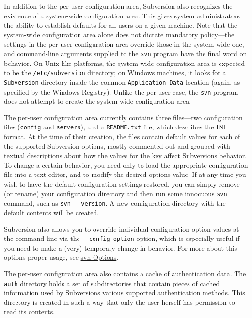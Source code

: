 In addition to the per-user configuration area, Subversion also
recognizes the existence of a system-wide configuration area. This gives
system administrators the ability to establish defaults for all users on
a given machine. Note that the system-wide configuration area alone does
not dictate mandatory policy---the settings in the per-user
configuration area override those in the system-wide one, and
command-line arguments supplied to the \texttt{svn} program have the
final word on behavior. On Unix-like platforms, the system-wide
configuration area is expected to be the \texttt{/etc/subversion}
directory; on Windows machines, it looks for a \texttt{Subversion}
directory inside the common \texttt{Application\ Data} location (again,
as specified by the Windows Registry). Unlike the per-user case, the
\texttt{svn} program does not attempt to create the system-wide
configuration area.

The per-user configuration area currently contains three files---two
configuration files (\texttt{config} and \texttt{servers}), and a
\texttt{README.txt} file, which describes the INI format. At the time of
their creation, the files contain default values for each of the
supported Subversion options, mostly commented out and grouped with
textual descriptions about how the values for the key affect
Subversion\textquotesingle s behavior. To change a certain behavior, you
need only to load the appropriate configuration file into a text editor,
and to modify the desired option\textquotesingle s value. If at any time
you wish to have the default configuration settings restored, you can
simply remove (or rename) your configuration directory and then run some
innocuous \texttt{svn} command, such as \texttt{svn\ -\/-version}. A new
configuration directory with the default contents will be created.

Subversion also allows you to override individual configuration option
values at the command line via the \texttt{-\/-config-option} option,
which is especially useful if you need to make a (very) temporary change
in behavior. For more about this option\textquotesingle s proper usage,
see \hyperref[svn.ref.svn.sw]{svn Options}.

The per-user configuration area also contains a cache of authentication
data. The \texttt{auth} directory holds a set of subdirectories that
contain pieces of cached information used by
Subversion\textquotesingle s various supported authentication methods.
This directory is created in such a way that only the user herself has
permission to read its contents.

